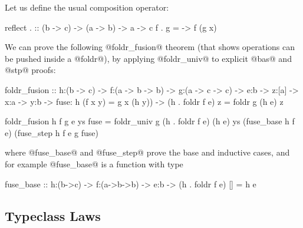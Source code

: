 %
Let us define the usual composition operator:
%
\begin{code}
reflect . :: (b -> c) -> (a -> b) -> a -> c
f . g     = \x -> f (g x)
\end{code}
%
We can prove the following @foldr_fusion@ theorem
(that shows operations can be pushed inside a @foldr@),
by applying @foldr_univ@ to explicit @bas@ and @stp@ proofs:
%
\begin{code}
  foldr_fusion
   :: h:(b -> c)
   -> f:(a -> b -> b)
   -> g:(a -> c -> c)
   -> e:b -> z:[a] -> x:a -> y:b
   -> fuse: {h (f x y) = g x (h y)})
   -> {(h . foldr f e) z = foldr g (h e) z}

  foldr_fusion h f g e ys fuse
    = foldr_univ g (h . foldr f e) (h e) ys
        (fuse_base h f e)
        (fuse_step h f e g fuse)
\end{code}
%
where @fuse_base@ and @fuse_step@ prove the
base and inductive cases, and for example
@fuse_base@ is a function with type
%
\begin{code}
fuse_base :: h:(b->c) -> f:(a->b->b) -> e:b
          -> {(h . foldr f e) [] = h e}
\end{code}

\subsection{Typeclass Laws}\label{subsec:list}

